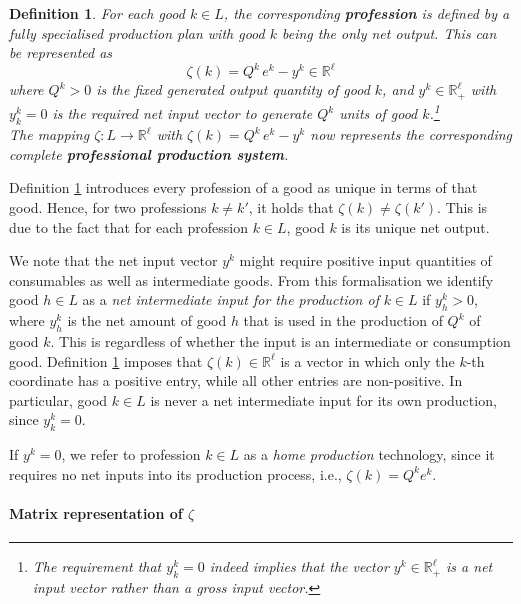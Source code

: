 \documentclass[11pt,fleqn]{article}
\newtheorem{definition}[theorem]{Definition}
\begin{document}
\begin{definition} \label{def:profession}
	For each good $k \in L$, the corresponding \textbf{profession} is defined by a fully specialised production plan with good $k$ being the only net output. This can be represented as
	\begin{equation}
	\zeta (k) = Q^k \, e^k - y^k \in \mathbb R^{\ell}
	\end{equation}
	where $Q^k >0$ is the fixed generated output quantity of good $k$, and $y^k \in \mathbb R^{\ell}_+$ with $y^k_k=0$ is the required net input vector to generate $Q^k$ units of good $k$.\footnote{The requirement that $y^k_k=0$ indeed implies that the vector $y^k \in \mathbb R^{\ell}_+$ is a \emph{net} input vector rather than a gross input vector. }
	\\
	The mapping $\zeta \colon L \to \mathbb R^{\ell}$ with $\zeta (k) = Q^k \, e^k - y^k$ now represents the corresponding complete \textbf{professional production system}.
\end{definition}

\noindent
Definition \ref{def:profession} introduces every profession of a good as unique in terms of that good. Hence, for two professions $k \neq k'$, it holds that $\zeta(k) \neq \zeta(k')$. This is due to the fact that for each profession $k \in L$, good $k$ is its unique net output.  

We note that the net input vector $y^k$ might require positive input quantities of consumables as well as intermediate goods. From this formalisation we identify good $h \in L$ as a \emph{net intermediate input for the production of} $k \in L$ if $y^k_h >0$, where $y^k_h$ is the net amount of good $h$ that is used in the production of $Q^k$ of good $k$. This is regardless of whether the input is an intermediate or consumption good. Definition \ref{def:profession} imposes that $\zeta (k) \in \mathbb R^\ell$ is a vector in which only the $k$-th coordinate has a positive entry, while all other entries are non-positive. In particular, good $k \in L$ is never a net intermediate input for its own production, since $y^k_k=0$. 

If $y^k=0$, we refer to profession $k \in L$ as a \emph{home production} technology, since it requires no net inputs into its production process, i.e., $\zeta (k) = Q^k e^k$.

\paragraph{Matrix representation of $\zeta$}
\end{document}
